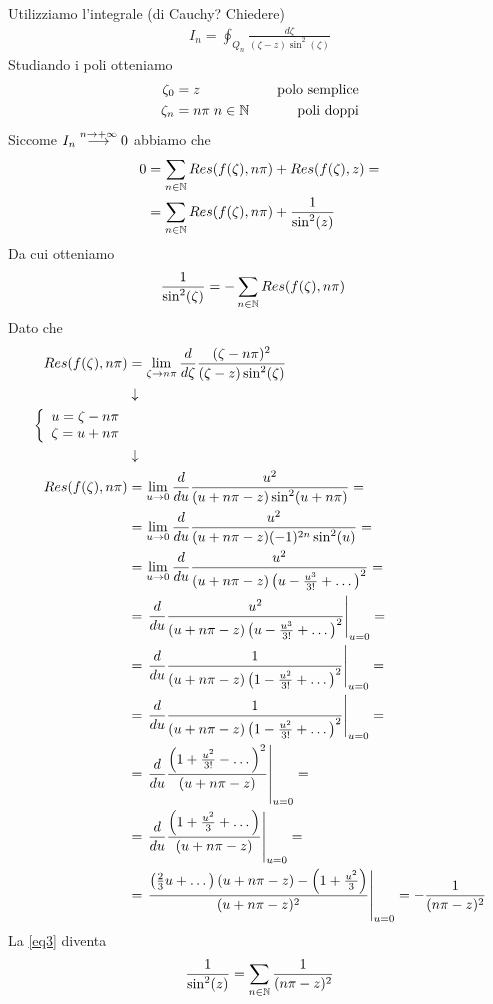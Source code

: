 Utilizziamo l'integrale (di Cauchy? Chiedere)
\begin{align}
	I_n = \oint_{Q_n} \frac{d\zeta}{(\zeta -z) \sin^2(\zeta)}
\end{align}
Studiando i poli otteniamo
\begin{align}
	\zeta_0 &= z \quad &\text{polo semplice}\\
	\zeta_n &= n\pi \; n\in \mathbb{N}  \quad &\text{poli doppi}
\end{align}
Siccome $I_n \overset{n \rightarrow +\infty}{\longrightarrow} 0$ abbiamo che
\begin{align}
	0 &= \sum_{n\in \mathbb{N}} Res(f(\zeta), n\pi) + Res(f(\zeta), z) =\nonumber\\
	  &= \sum_{n\in \mathbb{N}} Res(f(\zeta), n\pi) + \frac{1}{\sin^2(z)}  \label{eq3}
\end{align}
Da cui otteniamo
\begin{align}
	  \frac{1}{\sin^2(\zeta)} &= -\sum_{n\in \mathbb{N}} Res(f(\zeta), n\pi)
\end{align}
Dato che
\begin{align}
	Res(f(\zeta), n\pi) &= \underset{\zeta \rightarrow n\pi}{\lim} \, \frac{d}{d\zeta} \frac{(\zeta - n\pi)^2}{(\zeta - z) \sin^2(\zeta)} \\ &\downarrow \nonumber \\
	\left\{ \begin{array}{cc} u=\zeta - n\pi\\ \zeta = u + n\pi \end{array} \right. \nonumber \\ &\downarrow \nonumber \\
	Res(f(\zeta), n\pi) &= \underset{u \rightarrow 0}{\lim} \, \frac{d}{du} \frac{u^2}{(u + n\pi - z) \sin^2(u + n\pi)} = \nonumber\\
	&= \underset{u \rightarrow 0}{\lim} \, \frac{d}{du} \frac{u^2}{(u + n\pi - z) (-1)^{2n} \sin^2(u)}= \nonumber\\
	&= \underset{u \rightarrow 0}{\lim} \, \frac{d}{du} \frac{u^2}{(u + n\pi - z) \left(u -\frac{u^3}{3!} + \dots\right)^2} =  \nonumber\\
	&= \left. \frac{d}{du} \frac{u^2}{(u + n\pi - z) \left(u -\frac{u^3}{3!} + \dots\right)^2} \right|_{u=0} = \nonumber \\
	&= \left. \frac{d}{du} \frac{1}{(u + n\pi - z) \left(1 -\frac{u^2}{3!} + \dots\right)^2} \right|_{u=0} = \nonumber \\
	&= \left. \frac{d}{du} \frac{1}{(u + n\pi - z) \left(1 -\frac{u^2}{3!} + \dots\right)^2} \right|_{u=0} = \nonumber \\
	&= \left. \frac{d}{du} \frac{\left(1 +\frac{u^2}{3!} - \dots\right)^2}{(u + n\pi - z) } \right|_{u=0} = \nonumber \\
	&= \left. \frac{d}{du} \frac{\left(1 +\frac{u^2}{3} + \dots\right)}{(u + n\pi - z) } \right|_{u=0} = \nonumber \\
	&= \left. \frac{\left( \frac{2}{3} u + \dots \right) (u + n\pi-z ) - \left(1 + \frac{u^2}{3}\right)}{(u+ n\pi -z)^2} \right|_{u=0} = -\frac{1}{(n\pi -z)^2}
\end{align}
La \ref{eq3} diventa
\begin{align}
	\frac{1}{\sin^2(z)} = \sum_{n\in \mathbb{N}} \frac{1}{(n\pi -z)^2}
\end{align}

